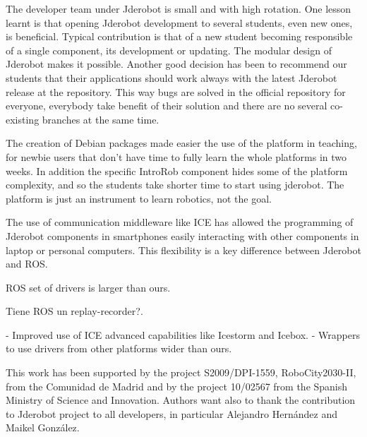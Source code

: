 \documentclass[twocolumn]{svjour3}          %
\begin{document}
The developer team under Jderobot is small and with high rotation. One lesson learnt is that opening Jderobot development to several students, even new ones, is beneficial. Typical contribution is that of a new student becoming responsible of a single component, its development or updating. The modular design of Jderobot makes it possible. Another good decision has been to recommend our students that their applications should work always with the latest Jderobot release at the repository. This way bugs are solved in the official repository for everyone, everybody take benefit of their solution and there are no several co-existing branches at the same time.

The creation of Debian packages made easier the use of the platform in teaching, for newbie users that don't have time to fully learn the whole platforms in two weeks. In addition the specific IntroRob component hides some of the platform complexity, and so the students take shorter time to start using jderobot. 
The platform is just an instrument to learn robotics, not the goal.

The use of communication middleware like ICE has allowed the programming of Jderobot components in smartphones easily interacting with other components in laptop or personal computers. This flexibility is a key difference between Jderobot and ROS. 

ROS set of drivers is larger than ours.

Tiene ROS un replay-recorder?.

- Improved use of ICE advanced capabilities like Icestorm and Icebox.
- Wrappers to use drivers from other platforms wider than ours.

\begin{acknowledgements}
This work has been supported by the project S2009/DPI-1559, RoboCity2030-II, from the Comunidad de Madrid and by the project 10/02567 from the Spanish Ministry of Science and Innovation. Authors want also to thank the contribution to Jderobot project to all developers, in particular Alejandro Hernández and Maikel González.
\end{acknowledgements}

\end{document}

